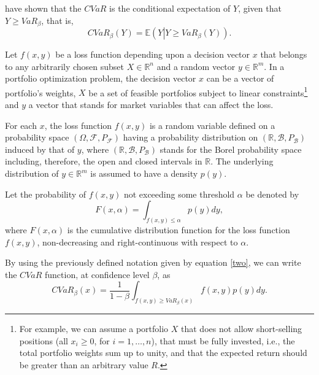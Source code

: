 \documentclass[a4paper,10pt]{article}
\begin{document}
\citet*{uryasev1999} have shown that the $CVaR$ is the conditional expectation of $Y$, given that $Y\geq VaR_{\beta }$, that is,
\begin{equation}
CVaR_{\beta }\left( Y\right) =\mathbb{E}\left( Y\left\vert Y\geq VaR_{\beta}\left( Y\right) \right. \right).  \label{three}
\end{equation}

Let $f\left( x,y\right) $ be a loss function depending upon a decision vector $x$ that belongs to any arbitrarily chosen subset $X\in\mathbb{R}^{n}$ and a random vector $y\in\mathbb{R}^{m}$. In a portfolio optimization problem, the decision vector $x$ can be a vector of portfolio's weights, $X$ be a set of feasible portfolios subject to linear constraints\footnote{For example, we can assume a portfolio $X$ that does not allow short-selling positions (all $x_{i}\geq 0$, for $i=1,\ldots,n$), that must be fully invested, i.e., the total portfolio weights sum up to unity, and that the expected return should be greater than an arbitrary value $R$.} and $y$ a vector that stands for market variables that can affect the loss.

For each $x$, the loss function $f\left( x,y\right) $ is a random variable defined on a probability space $\left( \Omega ,\mathcal{F},P_{\mathcal{F}}\right) $ having a probability distribution on $\left(\mathbb{R},\mathcal{B},P_{\mathcal{B}}\right) $ induced by that of $y$, where $\left(\mathbb{R},\mathcal{B},P_{\mathcal{B}}\right) $ stands for the Borel probability space including, therefore, the open and closed intervals in $\mathbb{R}$. The underlying distribution of $y\in\mathbb{R}^{m}$ is assumed to have a density $p(y)$.

Let the probability of $f\left(x,y\right)$ not exceeding some threshold $\alpha$ be denoted by
\begin{equation}
F(x,\alpha)=\int_{f(x,y)\leq \alpha}p(y)dy,  \label{four}
\end{equation}
where $F(x,\alpha)$ is the cumulative distribution function for the loss function $f\left(x,y\right) $, non-decreasing and right-continuous with respect to $\alpha$.

By using the previously defined notation given by equation \eqref{two}, we can write the $CVaR$ function, at confidence level $\beta $, as
\begin{equation}
CVaR_{\beta }\left( x\right) = \frac{1}{1-\beta }\int_{f(x,y)\geq VaR_{\beta}\left( x\right)}f(x,y)p(y)dy. \label{five}
\end{equation}
\end{document}

